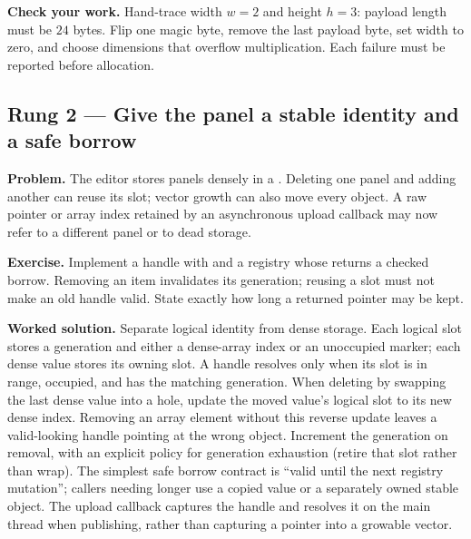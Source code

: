 \textbf{Check your work.} Hand-trace width \(w=2\) and height \(h=3\): payload length must be \(24\) bytes. Flip one magic byte, remove the last payload byte, set width to zero, and choose dimensions that overflow multiplication. Each failure must be reported before allocation.

\subsection{Rung 2 --- Give the panel a stable identity and a safe borrow}\label{02-foundations-ii-ch038-rung-2-give-the-panel-a-stable-identity-and-a-safe-borrow}

\hypertarget{02-foundations-ii-ch038-rung-2-give-the-panel-a-stable-identity-and-a-safe-borrow}{}

\textbf{Problem.} The editor stores panels densely in a . Deleting one panel and adding another can reuse its slot; vector growth can also move every object. A raw pointer or array index retained by an asynchronous upload callback may now refer to a different panel or to dead storage.

\textbf{Exercise.} Implement a handle with  and a registry whose  returns a checked borrow. Removing an item invalidates its generation; reusing a slot must not make an old handle valid. State exactly how long a returned pointer may be kept.

\textbf{Worked solution.} Separate logical identity from dense storage. Each logical slot stores a generation and either a dense-array index or an unoccupied marker; each dense value stores its owning slot. A handle resolves only when its slot is in range, occupied, and has the matching generation. When deleting by swapping the last dense value into a hole, update the moved value's logical slot to its new dense index. Removing an array element without this reverse update leaves a valid-looking handle pointing at the wrong object. Increment the generation on removal, with an explicit policy for generation exhaustion (retire that slot rather than wrap). The simplest safe borrow contract is ``valid until the next registry mutation''; callers needing longer use a copied value or a separately owned stable object. The upload callback captures the handle and resolves it on the main thread when publishing, rather than capturing a pointer into a growable vector.


